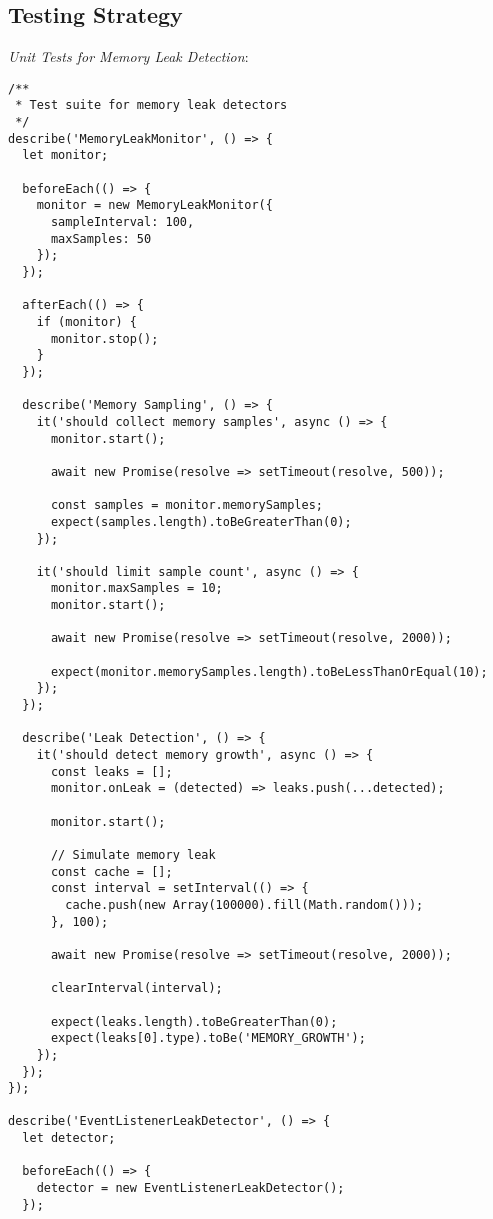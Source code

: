\documentclass[11pt]{article}
\begin{document}
\subsection{Testing Strategy}
\label{sec:orgb1ba36b}

\emph{Unit Tests for Memory Leak Detection}:

\begin{verbatim}
/**
 * Test suite for memory leak detectors
 */
describe('MemoryLeakMonitor', () => {
  let monitor;
  
  beforeEach(() => {
    monitor = new MemoryLeakMonitor({
      sampleInterval: 100,
      maxSamples: 50
    });
  });
  
  afterEach(() => {
    if (monitor) {
      monitor.stop();
    }
  });
  
  describe('Memory Sampling', () => {
    it('should collect memory samples', async () => {
      monitor.start();
      
      await new Promise(resolve => setTimeout(resolve, 500));
      
      const samples = monitor.memorySamples;
      expect(samples.length).toBeGreaterThan(0);
    });
    
    it('should limit sample count', async () => {
      monitor.maxSamples = 10;
      monitor.start();
      
      await new Promise(resolve => setTimeout(resolve, 2000));
      
      expect(monitor.memorySamples.length).toBeLessThanOrEqual(10);
    });
  });
  
  describe('Leak Detection', () => {
    it('should detect memory growth', async () => {
      const leaks = [];
      monitor.onLeak = (detected) => leaks.push(...detected);
      
      monitor.start();
      
      // Simulate memory leak
      const cache = [];
      const interval = setInterval(() => {
        cache.push(new Array(100000).fill(Math.random()));
      }, 100);
      
      await new Promise(resolve => setTimeout(resolve, 2000));
      
      clearInterval(interval);
      
      expect(leaks.length).toBeGreaterThan(0);
      expect(leaks[0].type).toBe('MEMORY_GROWTH');
    });
  });
});

describe('EventListenerLeakDetector', () => {
  let detector;
  
  beforeEach(() => {
    detector = new EventListenerLeakDetector();
  });
  

\end{verbatim}
\end{document}
